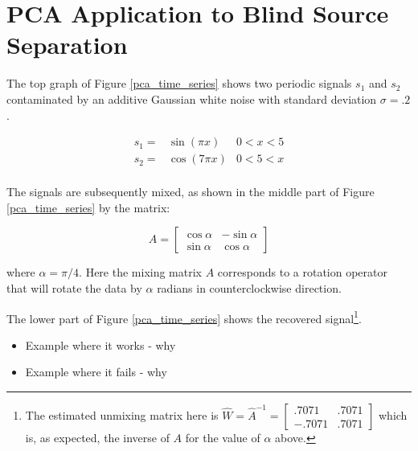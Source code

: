 \documentclass[11pt, oneside, a4paper]{report}
\begin{document}
\section{PCA Application to Blind Source Separation}\label{pca_bss}

The top graph of Figure \ref{pca_time_series} shows two periodic signals $s_1$ and $s_2$ contaminated by an additive Gaussian white noise with standard deviation $\sigma = .2$.

\begin{equation}
      \begin{array}{lll}
        s_1 = & \sin(\pi x) & 0<x<5\\
        s_2 = & \cos(7 \pi x) & 0<5<x\\
    \end{array}
\end{equation}

The signals are subsequently mixed, as shown in the middle part of Figure \ref{pca_time_series} by the matrix:

\begin{equation}
  A = \begin{bmatrix} \cos \alpha & -\sin \alpha \\ \sin \alpha & \cos \alpha \end{bmatrix}
\end{equation}

where $\alpha = \pi/4$. Here the mixing matrix $A$ corresponds to a rotation operator that will rotate the data by $\alpha$ radians in counterclockwise direction. 

The lower part of Figure \ref{pca_time_series} shows the recovered signal\footnote{The estimated unmixing matrix here is $\hat{W} = \hat{A}^{-1} = \begin{bmatrix} .7071 & .7071 \\ -.7071 & .7071 \end{bmatrix}$ which is, as expected, the inverse of $A$ for the value of $\alpha$ above.}.

\begin{itemize}
  \item Example where it works - why
  \item Example where it fails - why
\end{itemize}
\end{document}
